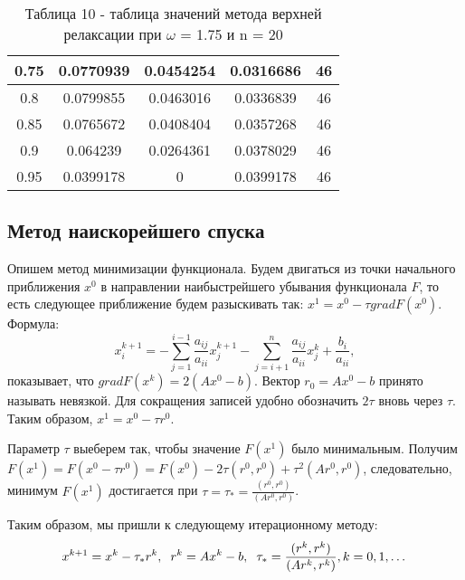 \documentclass[a4paper,12pt]{article}
\begin{document}
\begin{enumerate}[label = \arabic*.]
{\begin{table}[h]
\begin{tabular}{|c|c|c|c|c|}
          0.75 &    0.0770939 &    0.0454254 &    0.0316686 & 46\\ \hline
          0.8 &    0.0799855 &    0.0463016 &    0.0336839 & 46\\ \hline
          0.85 &    0.0765672 &    0.0408404 &    0.0357268 & 46\\ \hline
          0.9 &     0.064239 &    0.0264361 &    0.0378029 & 46\\ \hline
          0.95 &    0.0399178 &            0 &    0.0399178 & 46\\ \hline
        \end{tabular}
        \caption*{\small{Таблица 10 - таблица значений метода верхней релаксации при $\omega$ = 1.75 и n = 20}}
      \end{table}
  }
\end{enumerate}
\newpage



\subsection{Метод наискорейшего спуска}

Опишем метод минимизации функционала. Будем двигаться из точки начального 
приближения $x^0$ в направлении наибыстрейшего убывания функционала $F$, 
то есть следующее приближение будем разыскивать так:
$x^1 = x^0 - \tau gradF(x^0).$ Формула:
\begin{equation}
  x^{k+1}_i = -\sum\limits_{j = 1}^{i - 1}\frac{a_{ij}}{a_{ii}} x^{k + 1}_j - \sum\limits_{j = i + 1}^{n}\frac{a_{ij}}{a_{ii}} x^k_j + \frac{b_i}{a_{ii}},
\end{equation}
показывает, что $gradF(x^k) = 2(Ax^0 - b)$. Вектор $r_0 = Ax^0 - b$ принято называть невязкой.
Для сокращения записей удобно обозначить  $2\tau$ вновь через $\tau$. Таким образом, 
$x^1 = x^0 - \tau r^0$.

Параметр $\tau$ выеберем так, чтобы значение $F(x^1)$ было минимальным. 
Получим $F(x^1) = F(x^0 - \tau r^0) = F(x^0) - 2\tau(r^0, r^0) + \tau^2(Ar^0, r^0)$, следовательно,
минимум $F(x^1)$ достигается при $\tau = \tau_* = \frac{(r^0, r^0)}{(Ar^0, r^0)}$.

Таким образом, мы пришли к следующему итерационному методу:
\begin{equation}
  x^{k + 1} = x^k - \tau_* r^k, \hspace{0.2cm} r^k = Ax^k - b, \hspace{0.2cm} \tau_* = \frac{(r^k, r^k)}{(Ar^k, r^k)}, k = 0, 1, \dots
\end{equation}
\end{document}
